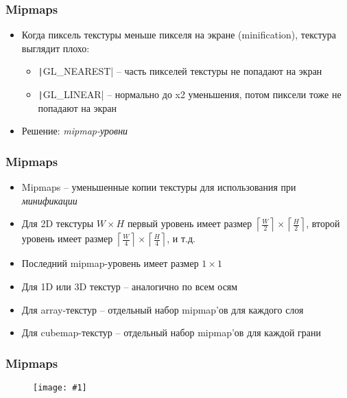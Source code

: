 \documentclass[10pt]{beamer}
\newcommand{\slideimage}[1]{
  \begin{figure}
    \begin{adjustbox}{width=\textwidth, totalheight=\textheight-2\baselineskip-2\baselineskip,keepaspectratio}
      \texttt{[image: \#1]}
    \end{adjustbox}
  \end{figure}
}
\begin{document}
\begin{frame}[fragile]
\frametitle{Mipmaps}
\begin{itemize}
\item Когда пиксель текстуры меньше пикселя на экране (minification), текстура выглядит плохо:
\begin{itemize}
\item \texttt|GL_NEAREST| -- часть пикселей текстуры не попадают на экран
\pause
\item \texttt|GL_LINEAR| -- нормально до x2 уменьшения, потом пиксели тоже не попадают на экран
\end{itemize}
\pause
\item Решение: \textit{mipmap-уровни}
\end{itemize}
\end{frame}

\begin{frame}[fragile]
\frametitle{Mipmaps}
\begin{itemize}
\item Mipmaps -- уменьшенные копии текстуры для использования при \textit{минификации}
\pause
\item Для 2D текстуры \begin{math}W\times H\end{math} первый уровень имеет размер \begin{math}\left\lceil\frac{W}{2}\right\rceil\times \left\lceil\frac{H}{2}\right\rceil\end{math}, второй уровень имеет размер \begin{math}\left\lceil\frac{W}{4}\right\rceil\times \left\lceil\frac{H}{4}\right\rceil\end{math}, и т.д.
\pause
\item Последний mipmap-уровень имеет размер \begin{math}1\times 1\end{math}
\pause
\item Для 1D или 3D текстур -- аналогично по всем осям
\pause
\item Для array-текстур -- отдельный набор mipmap'ов для каждого слоя
\pause
\item Для cubemap-текстур -- отдельный набор mipmap'ов для каждой грани
\end{itemize}
\end{frame}

\begin{frame}
\frametitle{Mipmaps}
\slideimage{mipmaps.png}
\end{frame}
\end{document}
